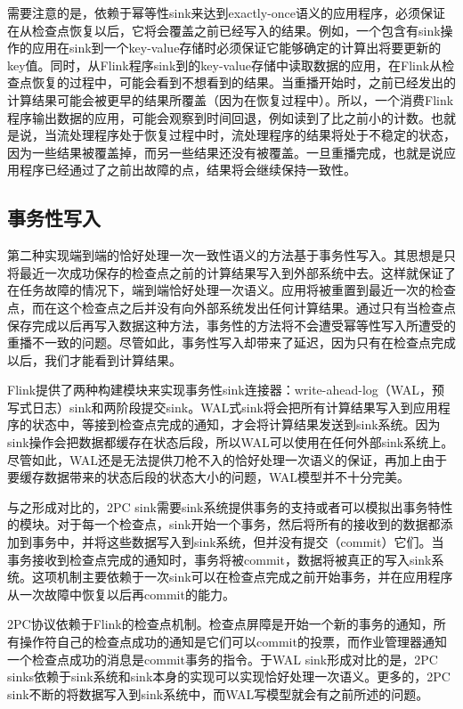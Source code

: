 \documentclass[cn,11pt,chinese]{elegantbook}
\begin{document}
需要注意的是，依赖于幂等性sink来达到exactly-once语义的应用程序，必须保证在从检查点恢复以后，它将会覆盖之前已经写入的结果。例如，一个包含有sink操作的应用在sink到一个key-value存储时必须保证它能够确定的计算出将要更新的key值。同时，从Flink程序sink到的key-value存储中读取数据的应用，在Flink从检查点恢复的过程中，可能会看到不想看到的结果。当重播开始时，之前已经发出的计算结果可能会被更早的结果所覆盖（因为在恢复过程中）。所以，一个消费Flink程序输出数据的应用，可能会观察到时间回退，例如读到了比之前小的计数。也就是说，当流处理程序处于恢复过程中时，流处理程序的结果将处于不稳定的状态，因为一些结果被覆盖掉，而另一些结果还没有被覆盖。一旦重播完成，也就是说应用程序已经通过了之前出故障的点，结果将会继续保持一致性。

\hypertarget{ux4e8bux52a1ux6027ux5199ux5165}{%
\subsection{事务性写入}\label{ux4e8bux52a1ux6027ux5199ux5165}}

第二种实现端到端的恰好处理一次一致性语义的方法基于事务性写入。其思想是只将最近一次成功保存的检查点之前的计算结果写入到外部系统中去。这样就保证了在任务故障的情况下，端到端恰好处理一次语义。应用将被重置到最近一次的检查点，而在这个检查点之后并没有向外部系统发出任何计算结果。通过只有当检查点保存完成以后再写入数据这种方法，事务性的方法将不会遭受幂等性写入所遭受的重播不一致的问题。尽管如此，事务性写入却带来了延迟，因为只有在检查点完成以后，我们才能看到计算结果。

Flink提供了两种构建模块来实现事务性sink连接器：write-ahead-log（WAL，预写式日志）sink和两阶段提交sink。WAL式sink将会把所有计算结果写入到应用程序的状态中，等接到检查点完成的通知，才会将计算结果发送到sink系统。因为sink操作会把数据都缓存在状态后段，所以WAL可以使用在任何外部sink系统上。尽管如此，WAL还是无法提供刀枪不入的恰好处理一次语义的保证，再加上由于要缓存数据带来的状态后段的状态大小的问题，WAL模型并不十分完美。

与之形成对比的，2PC
sink需要sink系统提供事务的支持或者可以模拟出事务特性的模块。对于每一个检查点，sink开始一个事务，然后将所有的接收到的数据都添加到事务中，并将这些数据写入到sink系统，但并没有提交（commit）它们。当事务接收到检查点完成的通知时，事务将被commit，数据将被真正的写入sink系统。这项机制主要依赖于一次sink可以在检查点完成之前开始事务，并在应用程序从一次故障中恢复以后再commit的能力。

2PC协议依赖于Flink的检查点机制。检查点屏障是开始一个新的事务的通知，所有操作符自己的检查点成功的通知是它们可以commit的投票，而作业管理器通知一个检查点成功的消息是commit事务的指令。于WAL
sink形成对比的是，2PC
sinks依赖于sink系统和sink本身的实现可以实现恰好处理一次语义。更多的，2PC
sink不断的将数据写入到sink系统中，而WAL写模型就会有之前所述的问题。
\end{document}

